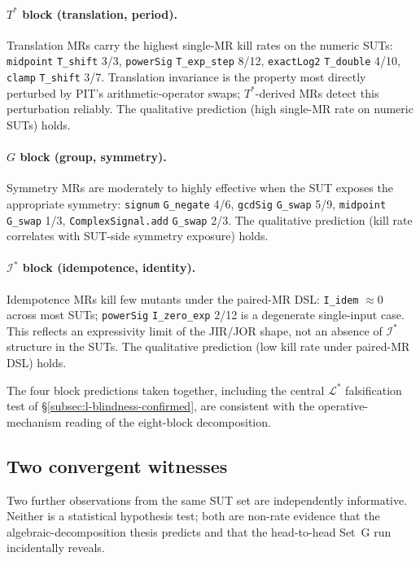 \paragraph{$T^{*}$ block (translation, period).}
Translation MRs carry the highest single-MR kill rates on the numeric
SUTs: \texttt{midpoint} \texttt{T\_shift} 3/3, \texttt{powerSig}
\texttt{T\_exp\_step} 8/12, \texttt{exactLog2} \texttt{T\_double}
4/10, \texttt{clamp} \texttt{T\_shift} 3/7. Translation invariance is
the property most directly perturbed by PIT's arithmetic-operator
swaps; $T^{*}$-derived MRs detect this perturbation reliably. The
qualitative prediction (high single-MR rate on numeric SUTs) holds.

\paragraph{$G$ block (group, symmetry).}
Symmetry MRs are moderately to highly effective when the SUT exposes
the appropriate symmetry: \texttt{signum} \texttt{G\_negate} 4/6,
\texttt{gcdSig} \texttt{G\_swap} 5/9, \texttt{midpoint}
\texttt{G\_swap} 1/3, \texttt{ComplexSignal.add} \texttt{G\_swap}
2/3. The qualitative prediction (kill rate correlates with SUT-side
symmetry exposure) holds.

\paragraph{$\mathcal{I}^{*}$ block (idempotence, identity).}
Idempotence MRs kill few mutants under the paired-MR DSL:
\texttt{I\_idem} $\approx 0$ across most SUTs; \texttt{powerSig}
\texttt{I\_zero\_exp} 2/12 is a degenerate single-input case. This
reflects an expressivity limit of the JIR/JOR shape, not an absence
of $\mathcal{I}^{*}$ structure in the SUTs. The qualitative
prediction (low kill rate under paired-MR DSL) holds.

The four block predictions taken together, including the central
$\mathcal{L}^{*}$ falsification test of
\S\ref{subsec:l-blindness-confirmed}, are consistent with the
operative-mechanism reading of the eight-block decomposition.

\subsection{Two convergent witnesses}
\label{subsec:convergent-witnesses}

Two further observations from the same SUT set are independently
informative. Neither is a statistical hypothesis test; both are
non-rate evidence that the algebraic-decomposition thesis predicts
and that the head-to-head Set~G run incidentally reveals.

